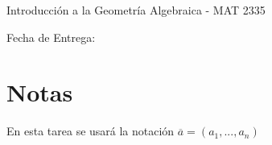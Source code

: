 \vspace{2ex}
{\Large \centerline{\bf \thetitle}
{\large \centerline{Introducción a la Geometría Algebraica - MAT 2335}}
\centerline{\normalsize Fecha de Entrega: \thedate}
\vfill

\begin{flushright}
    \large\theauthor
\end{flushright}
\newpage
{}
\tableofcontents
\newpage

\section*{Notas}
En esta tarea se usará la notación $\overline{a}=(a_1,...,a_n)$

\begin{prob}{1.25}

\end{prob}

\begin{sol}{1.25}

\end{sol}

\begin{prob}{1.29}

\end{prob}

\begin{sol}{1.29}

\end{sol}

\begin{prob}{1.30}

\end{prob}

\begin{sol}{1.30}

\end{sol}

\begin{prob}{1.31}

\end{prob}

\begin{sol}{1.31}

\end{sol}

\begin{prob}{1.33}

\end{prob}

\begin{sol}{1.33}

\end{sol}

}
